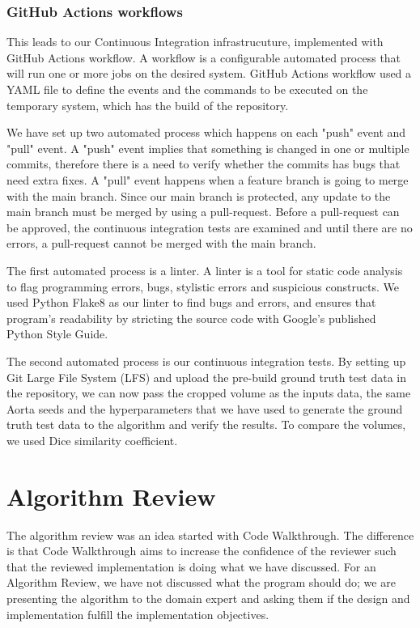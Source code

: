 \subsubsection{GitHub Actions workflows}
This leads to our Continuous Integration infrastrucuture, implemented with GitHub Actions workflow. A workflow is a configurable automated process that will run one or more jobs on the desired system. GitHub Actions workflow used a YAML file to define the events and the commands to be executed on the temporary system, which has the build of the repository. \citep{GitHubActions}

We have set up two automated process which happens on each "push" event and "pull" event. A "push" event implies that something is changed in one or multiple commits, therefore there is a need to verify whether the commits has bugs that need extra fixes. A "pull" event happens when a feature branch is going to merge with the main branch. Since our main branch is protected, any update to the main branch must be merged by using a pull-request. Before a pull-request can be approved, the continuous integration tests are examined and until there are no errors, a pull-request cannot be merged with the main branch. 

The first automated process is a linter. A linter is a tool for static code analysis to flag programming errors, bugs, stylistic errors and suspicious constructs. We used Python Flake8 as our linter to find bugs and errors, and ensures that program's readability by stricting the source code with Google's published  Python Style Guide. \citep{Linter}

The second automated process is our continuous integration tests. By setting up Git Large File System (LFS) and upload the pre-build ground truth test data in the repository, we can now pass the cropped volume as the inputs data, the same Aorta seeds and the hyperparameters that we have used to generate the ground truth test data to the algorithm and verify the results. To compare the volumes, we used Dice similarity coefficient.

\section{Algorithm Review}

The algorithm review was an idea started with Code Walkthrough. The difference is that Code Walkthrough aims to increase the confidence of the reviewer such that the reviewed implementation is doing what we have discussed. For an Algorithm Review, we have not discussed what the program should do; we are presenting the algorithm to the domain expert and asking them if the design and implementation fulfill the implementation objectives.

